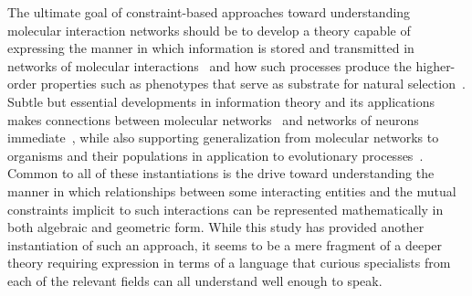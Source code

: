 The ultimate goal of constraint-based approaches toward understanding molecular interaction networks should be to develop a theory capable of expressing the manner in which information is stored and transmitted in networks of molecular interactions~\cite{Tkacik2011a,Bialek2012} and how such processes produce the higher-order properties such as phenotypes that serve as substrate for natural selection~\cite{Mora2013}. Subtle but essential developments in information theory and its applications makes connections between molecular networks~\cite{Cheong2011,Brennan2012} and networks of neurons immediate~\cite{Stanley1999,Balduzzi2008,Balduzzi2009,Balduzzi2012}, while also supporting generalization from molecular networks to organisms and their populations in application to evolutionary processes~\cite{Kussell2005a,Rivoire2011}. Common to all of these instantiations is the drive toward understanding the manner in which relationships between some interacting entities and the mutual constraints implicit to such interactions can be represented mathematically in both algebraic and geometric form. While this study has provided another instantiation of such an approach, it seems to be a mere fragment of a deeper theory requiring expression in terms of a language that curious specialists from each of the relevant fields can all understand well enough to speak.
